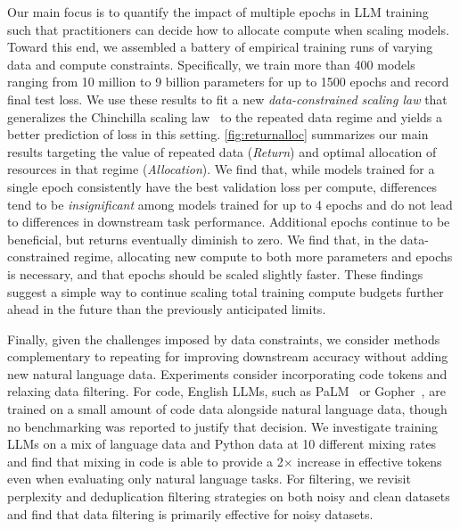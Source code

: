 \documentclass{article}
\begin{document}
Our main focus is to quantify the impact of multiple epochs in LLM training such that practitioners can decide how to allocate compute when scaling models. Toward this end, we assembled a battery of empirical training runs of varying data and compute constraints. Specifically, we train more than 400 models ranging from 10 million to 9 billion parameters for up to 1500 epochs and record final test loss. We use these results to fit a new \emph{data-constrained scaling law} that generalizes the Chinchilla scaling law~\citep{hoffmann2022training} to the repeated data regime and yields a better prediction of loss in this setting. \autoref{fig:returnalloc} summarizes our main results targeting the value of repeated data (\textit{Return}) and optimal allocation of resources in that regime (\textit{Allocation}). We find that, while models trained for a single epoch consistently have the best validation loss per compute, differences tend to be \emph{insignificant} among models trained for up to 4 epochs and do not lead to differences in downstream task performance. Additional epochs continue to be beneficial, but returns eventually diminish to zero. We find that, in the data-constrained regime, allocating new compute to both more parameters and epochs is necessary, and that epochs should be scaled slightly faster. These findings suggest a simple way to continue scaling total training compute budgets further ahead in the future than the previously anticipated limits.


Finally, given the challenges imposed by data constraints, we consider methods complementary to repeating for improving downstream accuracy without adding new natural language data. Experiments consider incorporating code tokens and relaxing data filtering. For code, English LLMs, such as PaLM~\cite{chowdhery2022palm} or Gopher~\cite{rae2021scaling}, are trained on a small amount of code data alongside natural language data, though no benchmarking was reported to justify that decision. We investigate training LLMs on a mix of language data and Python data at 10 different mixing rates and find that mixing in code is able to provide a 2$\times$ increase in effective tokens even when evaluating only natural language tasks. For filtering, we revisit perplexity and deduplication filtering strategies on both noisy and clean datasets and find that data filtering is primarily effective for noisy datasets.
\end{document}
